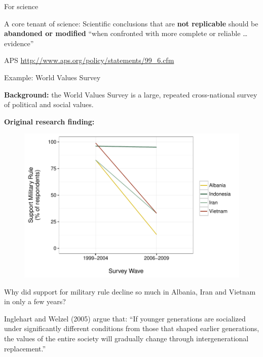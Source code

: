 \documentclass[10pt]{beamer}
\begin{document}
\begin{frame}{For science}

    A \alert{core tenant} of science: Scientific conclusions that are \textbf{not replicable} should be \textbf{abandoned or modified} ``when confronted with more complete or reliable \ldots evidence''

{\tiny{APS \url{http://www.aps.org/policy/statements/99_6.cfm}}}

\end{frame}

\begin{frame}{Example: World Values Survey}

    \textbf{Background:} the World Values Survey is a large, repeated cross-national survey of political and social values.

    \textbf{Original research finding:}

    \begin{figure}
        \includegraphics[scale=0.5]{img/wvs_compare.pdf}
    \end{figure}

\end{frame}

\begin{frame}

    \begin{center}
        {\large{Why did support for military rule decline so much in Albania, Iran and Vietnam in only a few years?}}

        \vspace{1cm}
    \end{center}

    Inglehart and Welzel (2005) argue that: ``If younger generations are socialized under significantly different conditions from those that shaped earlier generations, the values of the entire society will gradually change through intergenerational replacement.''

\end{frame}
\end{document}
